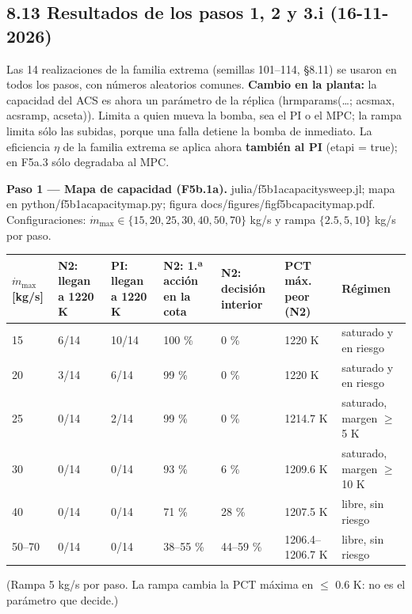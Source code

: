 \documentclass[11pt,a4paper]{article}
\newcommand{\codeus}{\textunderscore\allowbreak}
\newcommand{\code}[1]{{\small\ttfamily\let\_\codeus #1}}
\begin{document}
\subsection*{8.13 Resultados de los pasos 1, 2 y 3.i (16-11-2026)}
Las 14 realizaciones de la familia extrema (semillas 101–114, \S{}8.11) se usaron en todos los pasos, con números aleatorios comunes. \textbf{Cambio en la planta:} la capacidad del ACS es ahora un parámetro de la réplica (\code{hrm\_params(…; acs\_max, acs\_ramp, acs\_eta)}). Limita a quien mueva la bomba, sea el PI o el MPC; la rampa limita sólo las subidas, porque una falla detiene la bomba de inmediato. La eficiencia $\eta$ de la familia extrema se aplica ahora \textbf{también al PI} (\code{eta\_pi = true}); en F5a.3 sólo degradaba al MPC.

\textbf{Paso 1 — Mapa de capacidad (F5b.1a).} \code{julia/f5b1a\_capacity\_sweep.jl}; mapa en \code{python/f5b1a\_capacity\_map.py}; figura \code{docs/figures/fig\_f5b\_capacity\_map.pdf}. Configuraciones: $\dot m_{\max}\in\{15,20,25,30,40,50,70\}$ kg/s y rampa $\{2.5,5,10\}$ kg/s por paso.

{\footnotesize
\begin{xltabular}{\linewidth}{@{}YYYYYYY@{}}
\toprule
\textbf{$\dot m_{\max}$ [kg/s]} & \textbf{N2: llegan a 1220 K} & \textbf{PI: llegan a 1220 K} & \textbf{N2: 1.ª acción en la cota} & \textbf{N2: decisión interior} & \textbf{PCT máx. peor (N2)} & \textbf{Régimen} \\
\midrule
{} & 6/14 & 10/14 & 100 \% & 0 \% & 1220 K & saturado y en riesgo \\
20 & 3/14 & 6/14 & 99 \% & 0 \% & 1220 K & saturado y en riesgo \\
25 & 0/14 & 2/14 & 99 \% & 0 \% & 1214.7 K & saturado, margen $\ge$ 5 K \\
30 & 0/14 & 0/14 & 93 \% & 6 \% & 1209.6 K & saturado, margen $\ge$ 10 K \\
40 & 0/14 & 0/14 & 71 \% & 28 \% & 1207.5 K & libre, sin riesgo \\
50–70 & 0/14 & 0/14 & 38–55 \% & 44–59 \% & 1206.4–1206.7 K & libre, sin riesgo \\
\bottomrule
\end{xltabular}}

(Rampa 5 kg/s por paso. La rampa cambia la PCT máxima en $\le$ 0.6 K: no es el parámetro que decide.)
\end{document}
